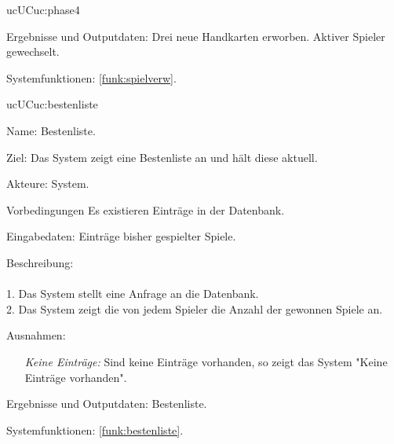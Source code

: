 \begin{description}[leftmargin=5em, style=sameline]
\begin{lhp}{uc}{UC}{uc:phase4}
\begin{itemize}
			\end{itemize}
		\item [Ergebnisse und Outputdaten:] Drei neue Handkarten erworben. Aktiver Spieler gewechselt.
		\item [Systemfunktionen:] \ref{funk:spielverw}.
	\end{lhp}


	\begin{lhp}{uc}{UC}{uc:bestenliste}
		\item [Name:] Bestenliste.
		\item [Ziel:] Das System zeigt eine Bestenliste an und hält diese aktuell.
		\item [Akteure:] System.
		\item [Vorbedingungen] Es existieren Einträge in der Datenbank.
		\item [Eingabedaten:] Einträge bisher gespielter Spiele.
		\item [Beschreibung:] \hfill\\ \hfill\\
			1. Das System stellt eine Anfrage an die Datenbank.\\
			2. Das System zeigt die von jedem Spieler die Anzahl der gewonnen Spiele an.\\
		\item [Ausnahmen:] \hfill
				\begin{itemize} 
					\item[] \textit{Keine Einträge:} Sind keine Einträge vorhanden, so zeigt das System "{}Keine Einträge vorhanden{}"{}.
					
				\end{itemize}
		\item [Ergebnisse und Outputdaten:] Bestenliste.	
		\item [Systemfunktionen:] \ref{funk:bestenliste}.
	\end{lhp}


\end{description}

